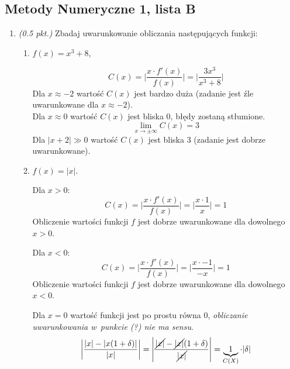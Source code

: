 \documentclass[12pt]{article}
\newenvironment{lista}[2][]{\newpage
\begin{center}
    \section[Lista \textbf{#2}]{Metody Numeryczne 1, lista #2}
\end{center}
\bigskip
#1
\begin{enumerate}[label=\textbf{#2\arabic*.}]}{\end{enumerate}}
\newcommand{\zad}[1][0.5]{\item \emph{(#1 pkt.) }}
\begin{document}
\begin{lista}{B}
\begin{enumerate}[wide, labelindent=0pt]
              \pagebreak
        \item $f(x) = \ln x$.

              \begin{mdframed}
                  \[ C(x) = \biggl|\frac{x\cdot f'(x)}{f(x)}\biggr| = \biggl|\frac{x\cdot\frac{1}{x}}{\ln x}\biggr| = \biggl|\frac{1}{\ln x}\biggr| \]
                  Dla $x \approx 1$ wartość $C(x)$ jest bardzo duża (zadanie jest źle uwarunkowane).\\
                  Dla $x \approx 0$ wartość $C(x)$ jest bliska $0$, błędy zostaną stłumione.\\
                  \[ \lim_{x\to\pm\infty} C(x) = 0\]
                  Dla $|x - 1| \gg 0$ zadanie jest dobrze uwarunkowane.
              \end{mdframed}
    \end{enumerate}

    \zad Zbadaj uwarunkowanie obliczania następujących funkcji:
    \begin{enumerate}[wide, labelindent=0pt]
        \item $f(x) = x^3+8$,

              \begin{mdframed}
                  \[ C(x) = \biggl|\frac{x\cdot f'(x)}{f(x)}\biggr| = \biggl|\frac{3x^3}{x^3+8}\biggr| \]
                  Dla $x \approx -2$ wartość $C(x)$ jest bardzo duża (zadanie jest źle uwarunkowane dla $x \approx -2$).\\
                  Dla $x \approx 0$ wartość $C(x)$ jest bliska $0$, błędy zostaną stłumione.\\
                  \[ \lim_{x\to\pm\infty} C(x) = 3\]
                  Dla $|x+2| \gg 0$ wartość $C(x)$ jest bliska $3$ (zadanie jest dobrze uwarunkowane).
              \end{mdframed}

        \item $f(x) = |x|$.

              \begin{mdframed}
                  Dla $x > 0$:
                  \[ C(x) = \biggl|\frac{x\cdot f'(x)}{f(x)}\biggr| = \biggl|\frac{x\cdot 1}{x}\biggr| = 1 \]
                  Obliczenie wartości funkcji $f$ jest dobrze uwarunkowane dla dowolnego $x > 0$.

                  \noindent Dla $x < 0$:
                  \[ C(x) = \biggl|\frac{x\cdot f'(x)}{f(x)}\biggr| = \biggl|\frac{x\cdot -1}{-x}\biggr| = 1 \]
                  Obliczenie wartości funkcji $f$ jest dobrze uwarunkowane dla dowolnego $x < 0$.

                  \noindent Dla $x = 0$ wartość funkcji jest po prostu równa $0$, \emph{obliczanie uwarunkowania w~punkcie (?) nie ma sensu}.\\

                  \[ \left| \frac{|x| - |x(1+\delta)|}{|x|}\right| = \left| \frac{\cancel{|x|} - \cancel{|x|}(1+\delta)}{\cancel{|x|}}\right| = \underbrace{1}_{C(X)}\cdot|\delta| \]
              \end{mdframed}
    \end{enumerate}
\end{lista}
\end{document}
